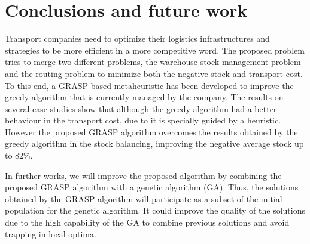 \documentclass[letterpaper]{article} %
\begin{document}
\section*{Conclusions and future work}


Transport companies need to optimize their logistics infrastructures and strategies to be more efficient in a more competitive word. The proposed problem tries to merge two different problems, the warehouse stock management problem and the routing problem to minimize both the negative stock and transport cost. To this end, a GRASP-based metaheuristic has been developed to improve the greedy algorithm that is currently managed by the company. The results on several case studies show that although the greedy algorithm had a better behaviour in the transport cost, due to it is specially guided by a heuristic. However the proposed GRASP algorithm overcomes the results obtained by the greedy algorithm in the stock balancing, improving the negative average stock up to 82\%.

In further works, we will improve the proposed algorithm by combining the proposed GRASP algorithm with a genetic algorithm (GA). Thus, the solutions obtained by the GRASP algorithm will participate as a subset of the initial population for the genetic algorithm. It could improve the quality of the solutions due to the high capability of the GA to combine previous solutions and avoid trapping in local optima.




\end{document}
